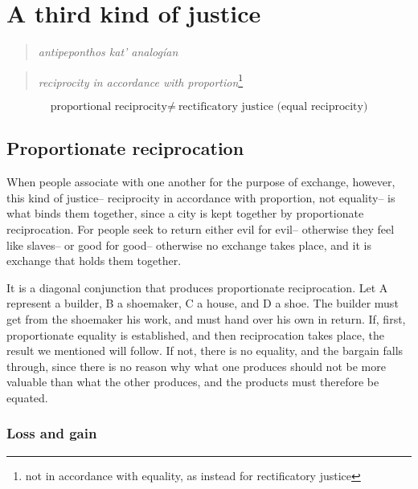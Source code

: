         \section{A third kind of justice}

            \begin{quote}
                \textit{antipeponthos kat' analogían}
            \end{quote}

            \begin{quote}
                \textit{reciprocity in accordance with proportion}\footnote{not in accordance with equality, as instead for rectificatory justice}
            \end{quote}

            \begin{equation}
                \text{proportional reciprocity} \neq \ \text{rectificatory justice (equal reciprocity)}
            \end{equation}

            \subsection{Proportionate reciprocation}

                When people associate with one another for the purpose of exchange, however, this kind of justice– reciprocity in accordance with proportion, not equality– is what binds them together, since a city is kept together by proportionate reciprocation. For people seek to return either evil for evil– otherwise they feel like slaves– or good for good– otherwise no exchange takes place, and it is exchange that holds them together.

                It is a diagonal conjunction that produces proportionate reciprocation. Let A represent a builder, B a shoemaker, C a house, and D a shoe. The builder must get from the shoemaker his work, and must hand over his own in return. If, first, proportionate equality is established, and then reciprocation takes place, the result we mentioned will follow. If not, there is no equality, and the bargain falls through, since there is no reason why what one produces should not be more valuable than what the other produces, and the products must therefore be equated.

                \subsubsection{Loss and gain}

